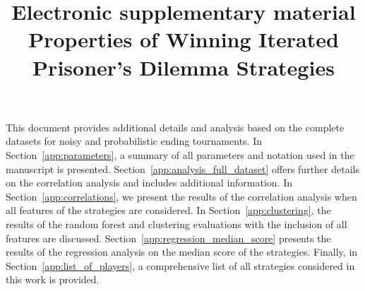 \documentclass{article}
\title{{\LARGE Electronic supplementary material}\\{\bf \LARGE Properties of Winning Iterated Prisoner's Dilemma Strategies}}
\author{}
\date{}
\begin{document}
\maketitle



\noindent
This document provides additional details and analysis based on the complete
datasets for noisy and probabilistic ending tournaments. In
Section~\ref{app:parameters}, a summary of all parameters and notation used in
the manuscript is presented. Section~\ref{app:analysis_full_dataset} offers
further details on the correlation analysis and includes additional information.
In Section~\ref{app:correlations}, we present the results of the correlation
analysis when all features of the strategies are considered. In
Section~\ref{app:clustering}, the results of the random forest and clustering
evaluations with the inclusion of all features are discussed.
Section~\ref{app:regression_median_score} presents the results of the regression
analysis on the median score of the strategies. Finally, in
Section~\ref{app:list_of_players}, a comprehensive list of all strategies
considered in this work is provided.










\end{document}
